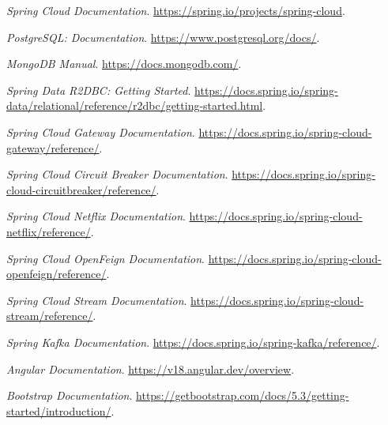 \documentclass[12pt,a4paper]{report}
\begin{document}
\begin{thebibliography}{99}

\textit{Spring Cloud Documentation}. \url{https://spring.io/projects/spring-cloud}. 

\textit{PostgreSQL: Documentation}. \url{https://www.postgresql.org/docs/}. 

\textit{MongoDB Manual}. \url{https://docs.mongodb.com/}. 

\textit{Spring Data R2DBC: Getting Started}. \url{https://docs.spring.io/spring-data/relational/reference/r2dbc/getting-started.html}. 

\textit{Spring Cloud Gateway Documentation}. \url{https://docs.spring.io/spring-cloud-gateway/reference/}. 

\textit{Spring Cloud Circuit Breaker Documentation}. \url{https://docs.spring.io/spring-cloud-circuitbreaker/reference/}. 

\textit{Spring Cloud Netflix Documentation}. \url{https://docs.spring.io/spring-cloud-netflix/reference/}. 

\textit{Spring Cloud OpenFeign Documentation}. \url{https://docs.spring.io/spring-cloud-openfeign/reference/}. 

\textit{Spring Cloud Stream Documentation}. \url{https://docs.spring.io/spring-cloud-stream/reference/}. 

\textit{Spring Kafka Documentation}. \url{https://docs.spring.io/spring-kafka/reference/}. 

\textit{Angular Documentation}. \url{https://v18.angular.dev/overview}. 

\textit{Bootstrap Documentation}. \url{https://getbootstrap.com/docs/5.3/getting-started/introduction/}. 

\end{thebibliography}
\end{document}
